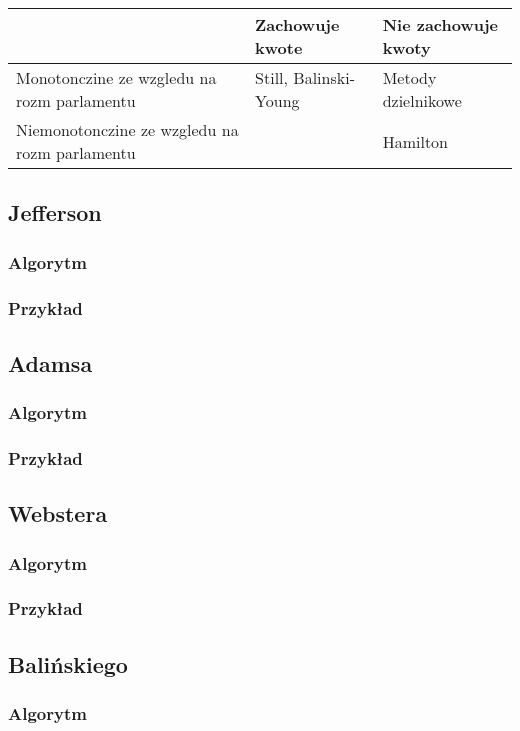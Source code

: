 \documentclass[12pt,a4paper]{article}
\begin{document}
\begin{center}
    \begin{tabular}{ | p{5cm} |l | l |}
    \hline
      & Zachowuje kwote &Nie zachowuje kwoty \\ \hline
    Monotonczine ze wzgledu na rozm parlamentu & Still, Balinski-Young& Metody dzielnikowe \\ \hline
    Niemonotonczine ze wzgledu na rozm parlamentu& & Hamilton \\ \hline
    
    
    \end{tabular}
\end{center}

\subsection{Jefferson}
\subsubsection{Algorytm}
\subsubsection{Przykład}
\subsection{Adamsa}
\subsubsection{Algorytm}
\subsubsection{Przykład}
\subsection{Webstera}
\subsubsection{Algorytm}
\subsubsection{Przykład}
\subsection{Balińskiego}
\subsubsection{Algorytm}
\end{document}
